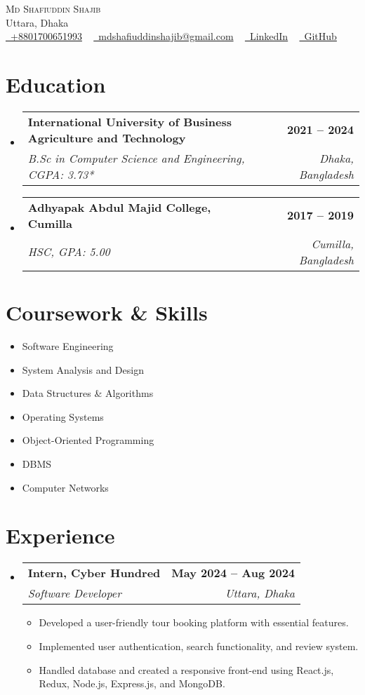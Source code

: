 \documentclass[letterpaper,11pt]{article}
\makeatletter
\newcommand{\resumeSubheading}[4]{
  \vspace{-2pt}\item
  \begin{tabular*}{\textwidth}{l@{\extracolsep{\fill}}r}
    \textbf{#1} & \textbf{#2} \\
    \textit{#3} & \textit{#4} \\
  \end{tabular*}\vspace{-5pt}
}
\newcommand{\resumeItem}[1]{\item \small{#1\vspace{-2pt}}}
\newcommand{\resumeSubHeadingListStart}{\begin{itemize}[leftmargin=0in, label={}]}
\newcommand{\resumeSubHeadingListEnd}{\end{itemize}}
\newcommand{\resumeItemListStart}{\begin{itemize}[label={-}]}
\newcommand{\resumeItemListEnd}{\end{itemize}}
\makeatother
\begin{document}
\begin{center}
    {\Huge \scshape Md Shafiuddin Shajib} \\ \vspace{1pt}
    Uttara, Dhaka \\ \vspace{1pt}
    \small \href{tel:+8801700651993}{\faPhone~+8801700651993} ~ 
    \href{mailto:mdshafiuddinshajib@gmail.com}{\faEnvelope~mdshafiuddinshajib@gmail.com} ~ 
    \href{https://www.linkedin.com/in/mdshafiuddinshajib/}{\faLinkedin~LinkedIn} ~
    \href{https://github.com/md-shafiuddin-shajib}{\faGithub~GitHub}
\end{center}

\section{Education}
  \resumeSubHeadingListStart
    \resumeSubheading
      {International University of Business Agriculture and Technology}{2021 -- 2024}
      {B.Sc in Computer Science and Engineering, CGPA: 3.73*}{Dhaka, Bangladesh}
    \resumeSubheading
      {Adhyapak Abdul Majid College, Cumilla}{2017 -- 2019}
      {HSC, GPA: 5.00}{Cumilla, Bangladesh}
  \resumeSubHeadingListEnd

\section{Coursework \& Skills}
\begin{multicols}{2}
\begin{itemize}[itemsep=0pt]
    \item Software Engineering
    \item System Analysis and Design
    \item Data Structures \& Algorithms
    \item Operating Systems
    \item Object-Oriented Programming
    \item DBMS
    \item Computer Networks
\end{itemize}
\end{multicols}

\section{Experience}
  \resumeSubHeadingListStart
    \resumeSubheading
      {Intern, Cyber Hundred}{May 2024 -- Aug 2024}
      {Software Developer}{Uttara, Dhaka}
      \resumeItemListStart
        \resumeItem{Developed a user-friendly tour booking platform with essential features.}
        \resumeItem{Implemented user authentication, search functionality, and review system.}
        \resumeItem{Handled database and created a responsive front-end using React.js, Redux, Node.js, Express.js, and MongoDB.}
      \resumeItemListEnd
  \resumeSubHeadingListEnd
\end{document}
